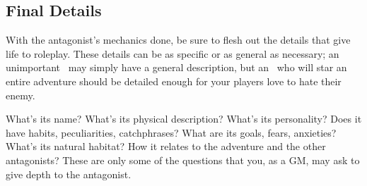 \begin{multicols}{2}
\subsection{Final Details}\label{gm-findet}
With the antagonist’s mechanics done, be sure to flesh out the details that give life to roleplay. These details can be as specific or as general as necessary; an unimportant \tmobmini\ may simply have a general description, but an \tmobleet\ who will star an entire adventure should be detailed enough for your players love to hate their enemy.

What's its name? What’s its physical description? What’s its personality? Does it have habits, peculiarities, catchphrases? What are its goals, fears, anxieties? What’s its natural habitat? How it relates to the adventure and the other antagonists? These are only some of the questions that you, as a GM, may ask to give depth to the antagonist.
\end{multicols}

